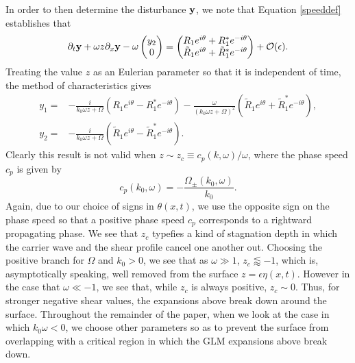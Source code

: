 \documentclass{JFM_Style/jfm}
\newcommand{\bp}{\begin{pmatrix}}
\newcommand{\ep}{\end{pmatrix}}
\newcommand{\pd}{\partial}
\begin{document}
In order to then determine the disturbance ${\bf y}$, we note that Equation \eqref{speeddef} establishes that
\begin{equation}
\pd_{t}{\bf y} + \omega z \pd_{x}{\bf y} - \omega \bp y_{2}\\ 0 \ep = \bp R_{1}e^{i\theta}+R^{\ast}_{1}e^{-i\theta}\\ \tilde{R}_{1}e^{i\theta}+\tilde{R}^{\ast}_{1}e^{-i\theta} \ep + \mathcal{O}(\epsilon).
\label{vareqn}
\end{equation}
Treating the value $z$ as an Eulerian parameter so that it is independent of time, the method of characteristics gives 
\begin{align*}
y_{1} = & - \frac{i}{k_{0}\omega z + \Omega}\left(R_{1}e^{i\theta} -R^{\ast}_{1}e^{-i\theta} \right) - \frac{\omega}{(k_{0}\omega z + \Omega)^{2}}\left(\tilde{R}_{1}e^{i\theta} + \tilde{R}^{\ast}_{1}e^{-i\theta} \right),\\
y_{2} = & - \frac{i}{k_{0}\omega z + \Omega}\left(\tilde{R}_{1}e^{i\theta} -\tilde{R}^{\ast}_{1}e^{-i\theta} \right).
\end{align*}
Clearly this result is not valid when $z\sim z_{c} \equiv c_{p}(k,\omega)/\omega$, where the phase speed $c_{p}$ is given by 
\[
c_{p}(k_{0},\omega) = -\frac{\Omega_{\pm}(k_{0},\omega)}{k_{0}}.
\]
Again, due to our choice of signs in $\theta(x,t)$, we use the opposite sign on the phase speed so that a positive phase speed $c_{p}$ corresponds to a rightward propagating phase.   We see that $z_{c}$ typefies a kind of stagnation depth in which the carrier wave and the shear profile cancel one another out.  Choosing the positive branch for $\Omega$ and $k_{0}>0$, we see that as $\omega \gg 1$, $z_{c}\lessapprox -1$, which is, asymptotically speaking, well removed from the surface $z=\epsilon \eta(x,t)$.  However in the case that $\omega \ll -1$, we see that, while $z_{c}$ is always positive, $z_{c}\sim 0$.  Thus, for stronger negative shear values, the expansions above break down around the surface.    Throughout the remainder of the paper, when we look at the case in which $k_{0}\omega <0$, we choose other parameters so as to prevent the surface from overlapping with a critical region in which the GLM expansions above break down. 
\end{document}
